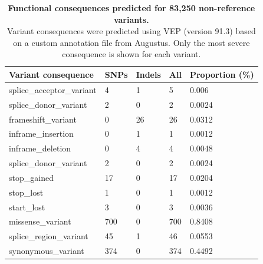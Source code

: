 \documentclass[../main.tex]{subfiles}
\begin{document}
\begin{flushleft}
\begin{table}[!htb]
    \centering
    \caption[Functional consequences of the non-reference variants]{\textbf{Functional consequences predicted for 83,250 non-reference variants.} \\
    \small{Variant consequences were predicted using VEP (version 91.3) based on a custom annotation file from Augustus. Only the most severe consequence is shown for each variant. }}
    \bigskip
    \bigskip
    \label{sup_tab:s45}
    \begin{tabular}{|l|l|l|l|l|}
    \hline
    \textbf{Variant consequence} & \textbf{SNPs} & \textbf{Indels} & \textbf{All} & \textbf{Proportion (\%)}  \\
    \hline
    splice\_acceptor\_variant    & 4             & 1               & 5            & 0.006                     \\
    \hline
    splice\_donor\_variant       & 2             & 0               & 2            & 0.0024                    \\
    \hline
    frameshift\_variant          & 0             & 26              & 26           & 0.0312                    \\
    \hline
    inframe\_insertion           & 0             & 1               & 1            & 0.0012                    \\
    \hline
    inframe\_deletion            & 0             & 4               & 4            & 0.0048                    \\
    \hline
    splice\_donor\_variant       & 2             & 0               & 2            & 0.0024                    \\
    \hline
    stop\_gained                 & 17            & 0               & 17           & 0.0204                    \\
    \hline
    stop\_lost                   & 1             & 0               & 1            & 0.0012                    \\
    \hline
    start\_lost                  & 3             & 0               & 3            & 0.0036                    \\
    \hline
    missense\_variant            & 700           & 0               & 700          & 0.8408                    \\
    \hline
    splice\_region\_variant      & 45            & 1               & 46           & 0.0553                    \\
    \hline
    synonymous\_variant          & 374           & 0               & 374          & 0.4492                    \\

\end{tabular}
\end{table}
\end{flushleft}
\end{document}
